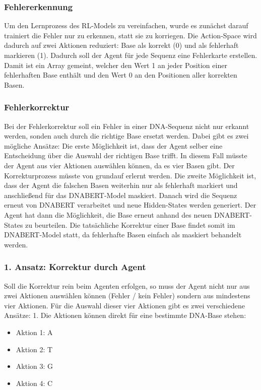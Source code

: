 \documentclass[oneside,bibliography=totocnumbered,BCOR=5mm]{scrbook}%
\theoremstyle{definition}
\theoremstyle{definition}
\theoremstyle{definition}
\theoremstyle{definition}
\theoremstyle{definition}
\theoremstyle{definition}
\begin{document}
\subsubsection{Fehlererkennung}
Um den Lernprozess des RL-Models zu vereinfachen, wurde es zunächst darauf trainiert die Fehler nur zu erkennen, statt sie zu korriegen.
Die Action-Space wird dadurch auf zwei Aktionen reduziert: Base als korrekt (0) und als fehlerhaft markieren (1).
Dadurch soll der Agent für jede Sequenz eine Fehlerkarte erstellen. 
Damit ist ein Array gemeint, welcher den Wert 1 an jeder Position einer fehlerhaften Base enthält und den Wert 0 an den Positionen aller korrekten Basen.\\

\subsubsection{Fehlerkorrektur}
Bei der Fehlerkorrektur soll ein Fehler in einer DNA-Sequenz nicht nur erkannt werden, sonden auch durch die richtige Base ersetzt werden.
Dabei gibt es zwei mögliche Ansätze: 
Die erste Möglichkeit ist, dass der Agent selber eine Entscheidung über die Auswahl der richtigen Base trifft. 
In diesem Fall müsste der Agent aus vier Aktionen auswählen können, da es vier Basen gibt. 
Der Korrekturprozess müsste von grundauf erlernt werden.
Die zweite Möglichkeit ist, dass der Agent die falschen Basen weiterhin nur als fehlerhaft markiert
und anschließend für das DNABERT-Model maskiert. 
Danach wird die Sequenz erneut von DNABERT verarbeitet
und neue Hidden-States werden generiert. Der Agent hat dann die Möglichkeit,
die Base erneut anhand des neuen DNABERT-States zu beurteilen. 
Die tatsächliche Korrektur einer Base findet somit im DNABERT-Model statt, da fehlerhafte
Basen einfach als maskiert behandelt werden.\\

\newpage

\subsubsection{1. Ansatz: Korrektur durch Agent}
Soll die Korrektur rein beim Agenten erfolgen, so muss der Agent nicht nur aus zwei Aktionen 
auswählen können (Fehler / kein Fehler) sondern aus mindestens vier Aktionen. 
Für die Auswahl dieser vier Aktionen gibt es zwei verschiedene Ansätze:
1. Die Aktionen können direkt für eine bestimmte DNA-Base stehen:\\

\begin{itemize}
  \item Aktion 1: A
  \item Aktion 2: T
  \item Aktion 3: G
  \item Aktion 4: C
\end{itemize}
\end{document}

